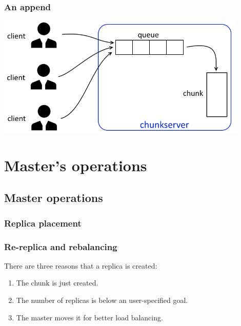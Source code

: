 \documentclass{beamer}
\newcommand{\slidewidth}{12cm}
\begin{document}
\begin{frame}
 \frametitle{An append}
 \centering
 \includegraphics[width=\slidewidth]{figures/appendsschema.png}
\end{frame}

\section{Master's operations}
\subsection{Master operations}
\begin{frame}
 \frametitle{Replica placement}
 
\end{frame}

%
\begin{frame}
 \frametitle{Re-replica and rebalancing}
 There are three reasons that a replica is created:
 \begin{enumerate}
  \item The chunk is just created.
  \item The number of replicas is below an user-specified goal.
  \item The master moves it for better load balancing.
 \end{enumerate}
\end{frame}
\end{document}
